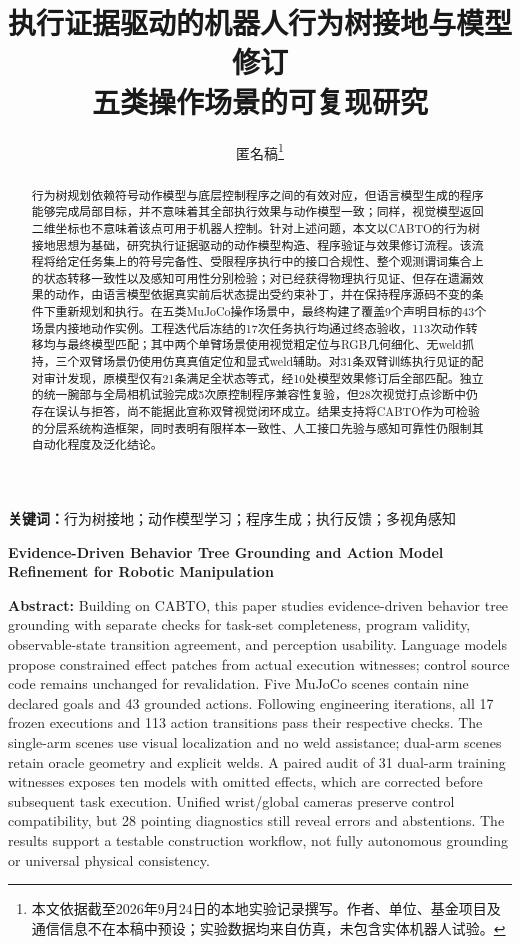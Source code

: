 \documentclass[UTF8,zihao=-4,fontset=fandol,a4paper]{ctexart}
\title{\heiti 执行证据驱动的机器人行为树接地与模型修订\\[5pt]\large 五类操作场景的可复现研究}
\author{匿名稿\thanks{本文依据截至2026年9月24日的本地实验记录撰写。作者、单位、基金项目及通信信息不在本稿中预设；实验数据均来自仿真，未包含实体机器人试验。}}
\date{}
\begin{document}
\maketitle
\thispagestyle{plain}
\begin{abstract}
行为树规划依赖符号动作模型与底层控制程序之间的有效对应，但语言模型生成的程序能够完成局部目标，并不意味着其全部执行效果与动作模型一致；同样，视觉模型返回二维坐标也不意味着该点可用于机器人控制。针对上述问题，本文以CABTO的行为树接地思想为基础，研究执行证据驱动的动作模型构造、程序验证与效果修订流程。该流程将给定任务集上的符号完备性、受限程序执行中的接口合规性、整个观测谓词集合上的状态转移一致性以及感知可用性分别检验；对已经获得物理执行见证、但存在遗漏效果的动作，由语言模型依据真实前后状态提出受约束补丁，并在保持程序源码不变的条件下重新规划和执行。在五类MuJoCo操作场景中，最终构建了覆盖9个声明目标的43个场景内接地动作实例。工程迭代后冻结的17次任务执行均通过终态验收，113次动作转移均与最终模型匹配；其中两个单臂场景使用视觉粗定位与RGB几何细化、无weld抓持，三个双臂场景仍使用仿真真值定位和显式weld辅助。对31条双臂训练执行见证的配对审计发现，原模型仅有21条满足全状态等式，经10处模型效果修订后全部匹配。独立的统一腕部与全局相机试验完成5次原控制程序兼容性复验，但28次视觉打点诊断中仍存在误认与拒答，尚不能据此宣称双臂视觉闭环成立。结果支持将CABTO作为可检验的分层系统构造框架，同时表明有限样本一致性、人工接口先验与感知可靠性仍限制其自动化程度及泛化结论。
\end{abstract}
\begingroup\small\noindent\textbf{关键词：}行为树接地；动作模型学习；程序生成；执行反馈；多视角感知\par\endgroup

\begin{center}
\large\bfseries Evidence-Driven Behavior Tree Grounding and Action Model Refinement for Robotic Manipulation
\end{center}
\begingroup\small
\noindent\textbf{Abstract:} Building on CABTO, this paper studies evidence-driven behavior tree grounding with separate checks for task-set completeness, program validity, observable-state transition agreement, and perception usability. Language models propose constrained effect patches from actual execution witnesses; control source code remains unchanged for revalidation. Five MuJoCo scenes contain nine declared goals and 43 grounded actions. Following engineering iterations, all 17 frozen executions and 113 action transitions pass their respective checks. The single-arm scenes use visual localization and no weld assistance; dual-arm scenes retain oracle geometry and explicit welds. A paired audit of 31 dual-arm training witnesses exposes ten models with omitted effects, which are corrected before subsequent task execution. Unified wrist/global cameras preserve control compatibility, but 28 pointing diagnostics still reveal errors and abstentions. The results support a testable construction workflow, not fully autonomous grounding or universal physical consistency.
\end{document}
